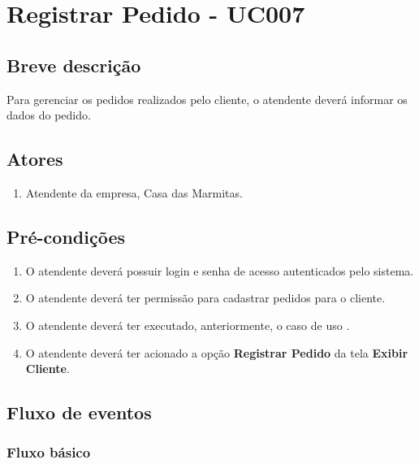 \chapter{Registrar Pedido - UC007} \label{uc007}

\section{Breve descrição}

Para gerenciar os pedidos realizados pelo cliente, o atendente deverá informar os dados do pedido.

\section{Atores}

\begin{enumerate}
	\item Atendente da empresa, Casa das Marmitas.
\end{enumerate}

\section{Pré-condições}

\begin{enumerate}
	\item O atendente deverá possuir login e senha de acesso autenticados pelo sistema.
	\item O atendente deverá ter permissão para cadastrar pedidos para o cliente.
	\item O atendente deverá ter executado, anteriormente, o caso de uso .
	\item O atendente deverá ter acionado a opção \textbf{Registrar Pedido} da tela \textbf{Exibir Cliente}.
\end{enumerate}

\section{Fluxo de eventos}

\subsection{Fluxo básico}


